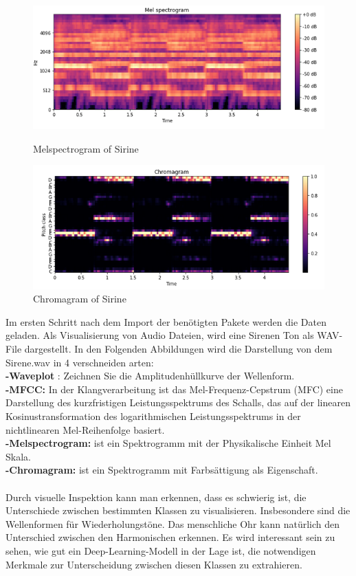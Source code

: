 \documentclass[a4paper,11pt]{article}
\theoremstyle{mytheor}
\begin{document}
\begin{figure}[htbp]
\begin{minipage}[c]{0.5\textwidth}

\includegraphics[width=\textwidth]{Melspectrogram.png}
	\caption {Melspectrogram of Sirine }
\end{minipage}
\hfill
\begin{minipage}[c]{0.5\textwidth}
\includegraphics[width=\textwidth]{Chromagram.png}
	\caption{Chromagram of Sirine}

\end{minipage}	
\end{figure}	
Im ersten Schritt nach dem Import der benötigten Pakete werden die
Daten geladen. Als Visualisierung von Audio Dateien, wird eine Sirenen Ton als WAV-File dargestellt. In den Folgenden Abbildungen wird die Darstellung von dem Sirene.wav in 4 verschneiden arten:
\\\textbf{-Waveplot} : Zeichnen Sie die Amplitudenhüllkurve der Wellenform.
\\\textbf{-MFCC:} In der Klangverarbeitung ist das Mel-Frequenz-Cepstrum (MFC) eine Darstellung des kurzfristigen Leistungsspektrums des Schalls, das auf der linearen Kosinustransformation des logarithmischen Leistungsspektrums in der nichtlinearen Mel-Reihenfolge basiert.
\\\textbf{-Melspectrogram:} ist ein Spektrogramm mit der Physikalische Einheit Mel Skala.
\\\textbf{-Chromagram:} ist ein Spektrogramm mit Farbsättigung als Eigenschaft.
\\\\Durch visuelle Inspektion kann man erkennen, dass es schwierig ist, die Unterschiede zwischen bestimmten Klassen zu visualisieren. Insbesondere sind die Wellenformen für Wiederholungstöne.
Das menschliche Ohr kann natürlich den Unterschied zwischen den Harmonischen erkennen. Es wird interessant sein zu sehen, wie gut ein Deep-Learning-Modell in der Lage ist, die notwendigen Merkmale zur Unterscheidung zwischen diesen Klassen zu extrahieren.
\end{document}
